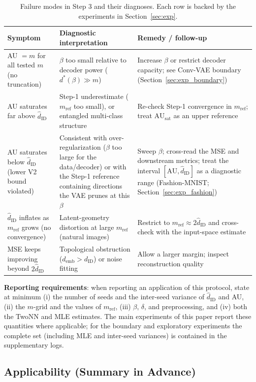 \documentclass[make,article,submit,pdftex,moreauthors]{Definitions/mdpi}
\newcommand{\dID}{d_{\mathrm{ID}}}
\newcommand{\hatdID}{\hat{d}_{\mathrm{ID}}}
\newcommand{\AUsat}{\mathrm{AU}_{\mathrm{sat}}}
\newcommand{\demb}{d_{\mathrm{emb}}}
\newcommand{\dstar}{d^{*}(\beta)}
\begin{document}
\begin{table}[H]
\caption{Failure modes in Step 3 and their diagnoses. Each row is backed by
the experiments in Section~\ref{sec:exp}.}
\label{tab:failure}
\small
\begin{tabular}{p{3.9cm}p{4.3cm}p{4.3cm}}
\toprule
\textbf{Symptom} & \textbf{Diagnostic interpretation} & \textbf{Remedy / follow-up} \\
\midrule
AU $= m$ for all tested $m$ (no truncation) & $\beta$ too small relative to decoder power ($\dstar \gg m$) & Increase $\beta$ or restrict decoder capacity; see Conv-VAE boundary (Section~\ref{sec:exp_boundary}) \\
AU saturates far above $\hatdID$ & Step-1 underestimate ($m_{\mathrm{ref}}$ too small), or entangled multi-class structure & Re-check Step-1 convergence in $m_{\mathrm{ref}}$; treat $\AUsat$ as an upper reference \\
AU saturates below $\hatdID$ (lower V2 bound violated) & Consistent with over-regularization ($\beta$ too large for the data/decoder) or with the Step-1 reference containing directions the VAE prunes at this $\beta$ & Sweep $\beta$; cross-read the MSE and downstream metrics; treat the interval $[\mathrm{AU}, \hatdID]$ as a diagnostic range (Fashion-MNIST; Section~\ref{sec:exp_fashion}) \\
$\hatdID$ inflates as $m_{\mathrm{ref}}$ grows (no convergence) & Latent-geometry distortion at large $m_{\mathrm{ref}}$ (natural images) & Restrict to $m_{\mathrm{ref}} \approx 2\hatdID$ and cross-check with the input-space estimate \\
MSE keeps improving beyond $2\hatdID$ & Topological obstruction ($\demb > \dID$) or noise fitting & Allow a larger margin; inspect reconstruction quality \\
\bottomrule
\end{tabular}
\end{table}

\textbf{Reporting requirements}:
when reporting an application of this protocol, state at minimum
(i) the number of seeds and the inter-seed variance of $\hatdID$ and AU,
(ii) the $m$-grid and the values of $m_{\mathrm{ref}}$,
(iii) $\beta$, $\delta$, and preprocessing, and
(iv) both the TwoNN and MLE estimates.
The main experiments of this paper report these quantities where
applicable; for the boundary and exploratory experiments the complete set
(including MLE and inter-seed variances) is contained in the supplementary
logs.

\subsection{Applicability (Summary in Advance)}\label{sec:protocol_applicability}
\end{document}

